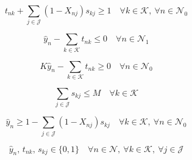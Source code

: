 \documentclass{article}
\begin{document}
\begin{equation}
t_{nk} + \sum_{j \in \mathcal{J}} (1 - X_{nj}) s_{kj} \ge 1
\quad \forall k \in \mathcal{K},\ \forall n \in \mathcal{N}_0
\tag{BP4-b}
\end{equation}

\begin{equation}
\hat{y}_n - \sum_{k \in \mathcal{K}} t_{nk} \le 0
\quad \forall n \in \mathcal{N}_1
\tag{BP4-c}
\end{equation}

\begin{equation}
K \hat{y}_n - \sum_{k \in \mathcal{K}} t_{nk} \ge 0
\quad \forall n \in \mathcal{N}_0
\tag{BP4-d}
\end{equation}

\begin{equation}
\sum_{j \in \mathcal{J}} s_{kj} \le M
\quad \forall k \in \mathcal{K}
\tag{BP4-e}
\end{equation}

\begin{equation}
\hat{y}_n \ge 1 - \sum_{j \in \mathcal{J}} (1 - X_{nj}) s_{kj}
\quad \forall k \in \mathcal{K},\ \forall n \in \mathcal{N}_0
\tag{BP4-f}
\end{equation}

\begin{equation}
\hat{y}_n,\, t_{nk},\, s_{kj} \in \{0,1\}
\quad \forall n \in \mathcal{N},\ \forall k \in \mathcal{K},\ \forall j \in \mathcal{J}
\tag{BP4-g}
\end{equation}
\end{document}
